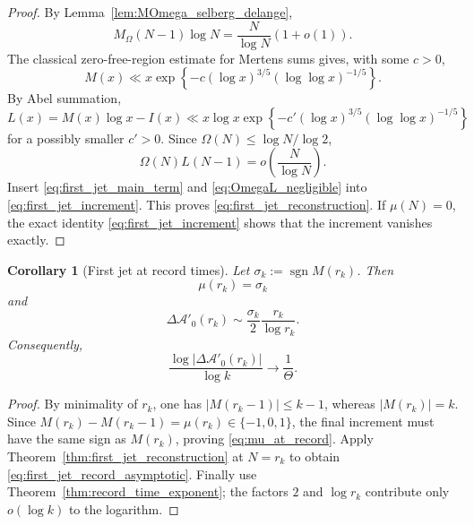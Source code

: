\documentclass[11pt]{amsart}
\numberwithin{equation}{section}
\theoremstyle{plain}
\newtheorem{corollary}[theorem]{Corollary}
\theoremstyle{definition}
\theoremstyle{remark}
\begin{document}
\begin{proof}
By Lemma~\ref{lem:MOmega_selberg_delange},
\begin{equation}
M_\Omega(N-1)\log N
=\frac{N}{\log N}(1+o(1)).
\label{eq:first_jet_main_term}
\end{equation}
The classical zero-free-region estimate for Mertens sums gives, with some
\(c>0\),
\begin{equation}
M(x)\ll
x\exp\left\{-c(\log x)^{3/5}(\log\log x)^{-1/5}\right\}.
\label{eq:classical_M_zero_free_bound}
\end{equation}
By Abel summation,
\begin{equation}
L(x)=M(x)\log x-I(x)
\ll
x\log x\exp\left\{-c'(\log x)^{3/5}(\log\log x)^{-1/5}\right\}
\label{eq:L_zero_free_bound}
\end{equation}
for a possibly smaller \(c'>0\).  Since
\(\Omega(N)\le\log N/\log2\),
\begin{equation}
\Omega(N)L(N-1)=o\!\left(\frac{N}{\log N}\right).
\label{eq:OmegaL_negligible}
\end{equation}
Insert \eqref{eq:first_jet_main_term} and
\eqref{eq:OmegaL_negligible} into
\eqref{eq:first_jet_increment}.  This proves
\eqref{eq:first_jet_reconstruction}.  If \(\mu(N)=0\), the exact identity
\eqref{eq:first_jet_increment} shows that the increment vanishes exactly.
\end{proof}

\begin{corollary}[First jet at record times]
\label{cor:first_jet_records}
Let
\(\sigma_k:=\operatorname{sgn}M(r_k)\).  Then
\begin{equation}
\mu(r_k)=\sigma_k
\label{eq:mu_at_record}
\end{equation}
and
\begin{equation}
\boxed{
\Delta\mathcal A'_0(r_k)
\sim
\frac{\sigma_k}{2}\frac{r_k}{\log r_k}.}
\label{eq:first_jet_record_asymptotic}
\end{equation}
Consequently,
\begin{equation}
\boxed{
\frac{\log|\Delta\mathcal A'_0(r_k)|}{\log k}
\longrightarrow\frac1\Theta.}
\label{eq:first_jet_record_theta}
\end{equation}
\end{corollary}

\begin{proof}
By minimality of \(r_k\), one has \(|M(r_k-1)|\le k-1\), whereas
\(|M(r_k)|=k\).  Since
\(M(r_k)-M(r_k-1)=\mu(r_k)\in\{-1,0,1\}\), the final increment must have the
same sign as \(M(r_k)\), proving \eqref{eq:mu_at_record}.  Apply
Theorem~\ref{thm:first_jet_reconstruction} at \(N=r_k\) to obtain
\eqref{eq:first_jet_record_asymptotic}.  Finally use
Theorem~\ref{thm:record_time_exponent}; the factors \(2\) and
\(\log r_k\) contribute only \(o(\log k)\) to the logarithm.
\end{proof}
\end{document}
